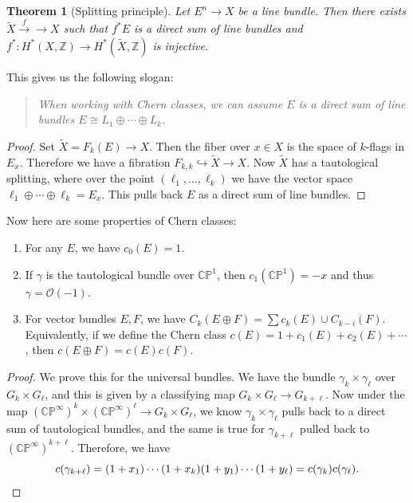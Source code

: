 \documentclass[leqno, openany]{memoir}
\newtheorem{thm}{Theorem}[section]
\theoremstyle{definition}
\theoremstyle{remark}
\theoremstyle{plain}
\theoremstyle{definition}
\theoremstyle{remark}
\newcommand{\C}{\mathbb{C}}
\newcommand{\Z}{\mathbb{Z}}
\renewcommand{\P}{\mathbb{P}}
\newcommand{\mc}[1]{\mathcal{#1}}
\newcommand{\wt}[1]{\widetilde{#1}}
\begin{document}
\begin{thm}[Splitting principle]
    Let $E^n \to X$ be a line bundle. Then there exists $\wt{X} \xrightarrow{f} \to X$ such that $f^* E$ is a direct sum of line bundles and $f^* \colon H^*(X, \Z) \to H^*(\wt{X}, \Z)$ is injective.
\end{thm}
This gives us the following slogan:
\begin{quotation}
    \textit{When working with Chern classes, we can assume $E$ is a direct sum of line bundles $E \cong L_1 \oplus \cdots \oplus L_k$.} 
\end{quotation}

\begin{proof}
    Set $\wt{X} = F_k(E) \to X$. Then the fiber over $x \in X$ is the space of $k$-flags in $E_x$. Therefore we have a fibration $F_{k,k} \hookrightarrow \wt{X} \to X$. Now $\wt{X}$ has a tautological splitting, where over the point $(\ell_1, \ldots, \ell_k)$ we have the vector space $\ell_1 \oplus \cdots \oplus \ell_k = E_x$. This pulls back $E$ as a direct sum of line bundles.
\end{proof}

Now here are some properties of Chern classes:
\begin{enumerate}
    \item For any $E$, we have $c_0(E) = 1$.
    \item If $\gamma$ is the tautological bundle over $\C\P^1$, then $c_1(\C\P^1) = -x$ and thus $\gamma = \mc{O}(-1)$.
    \item For vector bundles $E, F$, we have $C_k(E \oplus F) = \sum c_k(E) \cup C_{k-i}(F)$. Equivalently, if we define the Chern class $c(E) = 1 + c_1(E) + c_2(E) + \cdots$, then $c(E \oplus F) = c(E) c(F)$.
\end{enumerate}

\begin{proof}
    We prove this for the universal bundles. We have the bundle $\gamma_k \times \gamma_{\ell}$ over $G_k \times G_{\ell}$, and this is given by a classifying map $G_k \times G_{\ell} \to G_{k + \ell}$. Now under the map ${(\C\P^{\infty})}^k \times {(\C\P^{\infty})}^{\ell} \to G_k \times G_{\ell}$, we know $\gamma_k \times \gamma_{\ell}$ pulls back to a direct sum of tautological bundles, and the same is true for $\gamma_{k+\ell}$ pulled back to ${(\C\P^{\infty})}^{k + \ell}$. Therefore, we have
    \[ c(\gamma_{k + \ell}) = (1 + x_1) \cdots (1 + x_k) (1 + y_1) \cdots (1 + y_{\ell}) = c(\gamma_k) c(\gamma_{\ell}). \qedhere \]
\end{proof}
\end{document}
